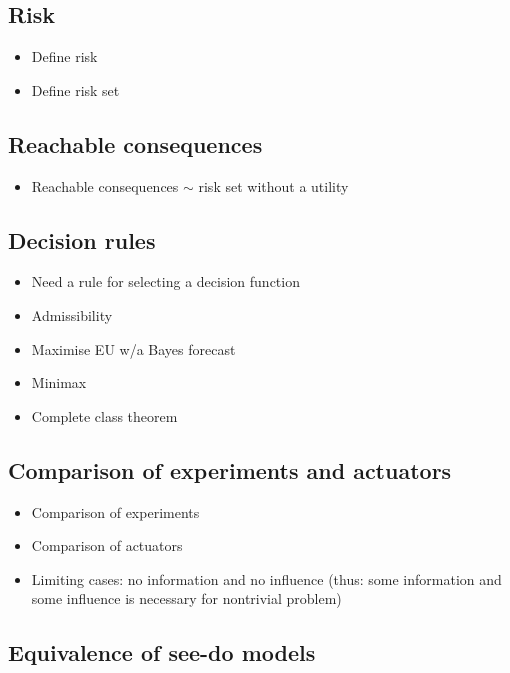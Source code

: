 \subsection{Risk}

\begin{itemize}
    \item Define risk
    \item Define risk set
\end{itemize}

\subsection{Reachable consequences}

\begin{itemize}
    \item Reachable consequences $\sim$ risk set without a utility
\end{itemize}

\subsection{Decision rules}

\begin{itemize}
    \item Need a rule for selecting a decision function
    \item Admissibility
    \item Maximise EU w/a Bayes forecast
    \item Minimax
    \item Complete class theorem
\end{itemize}

\subsection{Comparison of experiments and actuators}

\begin{itemize}
    \item Comparison of experiments
    \item Comparison of actuators
    \item Limiting cases: no information and no influence (thus: some information and some influence is necessary for nontrivial problem)
\end{itemize}

\subsection{Equivalence of see-do models}

